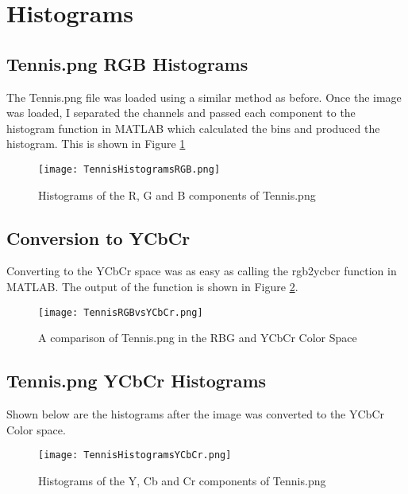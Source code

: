 \section{Histograms}
\subsection{Tennis.png RGB Histograms}
The Tennis.png file was loaded using a similar method as before. Once the image was loaded, I separated the channels and passed each component to the histogram function in MATLAB which calculated the bins and produced the histogram. This is shown in Figure \ref{fig:TennisRGBHistogram}

\begin{figure}[!h]
    \texttt{[image: TennisHistogramsRGB.png]}
    \centering
    \caption{Histograms of the R, G and B components of Tennis.png}
    \label{fig:TennisRGBHistogram}
\end{figure}

\subsection{Conversion to YCbCr}
Converting to the YCbCr space was as easy as calling the rgb2ycbcr function in MATLAB. The output of the function is shown in Figure \ref{fig:TennisYCbCr}.

\begin{figure}[!h]
    \texttt{[image: TennisRGBvsYCbCr.png]}
    \centering
    \caption{A comparison of Tennis.png in the RBG and YCbCr Color Space}
    \label{fig:TennisYCbCr}
\end{figure}

\subsection{Tennis.png YCbCr Histograms}
Shown below are the histograms after the image was converted to the YCbCr Color space.

\begin{figure}[!h]
    \texttt{[image: TennisHistogramsYCbCr.png]}
    \centering
    \caption{Histograms of the Y, Cb and Cr components of Tennis.png}
    \label{fig:TennisYCbCrHistogram}
\end{figure}

